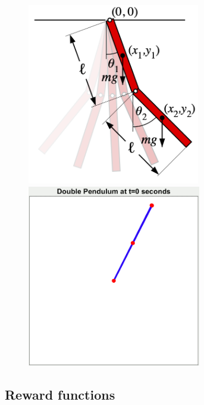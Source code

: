\documentclass[
  letterpaper,
  DIV=11,
  numbers=noendperiod,
  oneside]{scrartcl}
\begin{document}
\begin{figure}

\begin{minipage}{0.50\linewidth}
\includegraphics[width=\textwidth,height=3.125in]{figs/acrobot.png}\end{minipage}%
%
\begin{minipage}{0.50\linewidth}
\includegraphics[width=\textwidth,height=3.125in]{figs/dp.gif}\end{minipage}%

\end{figure}%


\subsection{Reward functions}\label{reward-functions}
\end{document}
